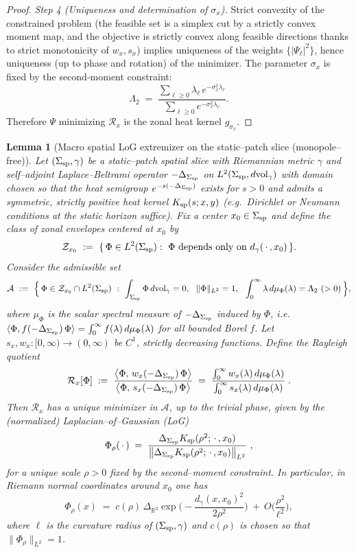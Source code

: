 \documentclass[10pt]{article}
\theoremstyle{definition}
\theoremstyle{plain}
\newtheorem{lemma}{Lemma}[section]
\begin{document}
\begin{proof}
\medskip
\textit{Step 4 (Uniqueness and determination of $\sigma_x$).}
Strict convexity of the constrained problem (the feasible set is a simplex cut by a strictly convex moment map, and the objective is strictly convex along feasible directions thanks to strict monotonicity of $w_x,s_x$) implies uniqueness of the weights $\{|\Psi_\ell|^2\}$, hence uniqueness (up to phase and rotation) of the minimizer. The parameter $\sigma_x$ is fixed by the second-moment constraint:
\[
\Lambda_2\;=\;\frac{\sum_{\ell\ge 0}\lambda_\ell\,e^{-\sigma_x^2\lambda_\ell}}{\sum_{\ell\ge 0}e^{-\sigma_x^2\lambda_\ell}}.
\]
Therefore $\Psi$ minimizing $\mathcal R_x$ is the zonal heat kernel $g_{\sigma_x}$.
\end{proof}

\begin{lemma}[Macro spatial LoG extremizer on the static--patch slice (monopole--free)]
\label{lem:spatial-log-static}
Let $(\Sigma_{\rm sp},\gamma)$ be a static--patch spatial slice with Riemannian metric $\gamma$ and
self--adjoint Laplace--Beltrami operator $-\Delta_{\Sigma_{\rm sp}}$ on $L^2(\Sigma_{\rm sp},d\mathrm{vol}_\gamma)$
with domain chosen so that the heat semigroup $e^{-s(-\Delta_{\Sigma_{\rm sp}})}$ exists for $s>0$ and admits a
symmetric, strictly positive heat kernel $K_{\rm sp}(s;x,y)$ (e.g.\ Dirichlet or Neumann conditions at the
static horizon suffice). Fix a center $x_0\in\Sigma_{\rm sp}$ and define the class of \emph{zonal} envelopes
centered at $x_0$ by
\[
\mathcal Z_{x_0}\ :=\ \{\,\Phi\in L^2(\Sigma_{\rm sp}):\ \Phi\ \text{depends only on }d_\gamma(\,\cdot\,,x_0)\,\}.
\]
Consider the admissible set
\[
\mathcal A\ :=\ \Big\{\,\Phi\in\mathcal Z_{x_0}\cap L^2(\Sigma_{\rm sp})\ :\ \int_{\Sigma_{\rm sp}}\Phi\,d\mathrm{vol}_\gamma=0,\ \ \|\Phi\|_{L^2}=1,\ \
\int_0^\infty \lambda\,d\mu_\Phi(\lambda)=\Lambda_2\ (>0)\,\Big\},
\]
where $\mu_\Phi$ is the scalar spectral measure of $-\Delta_{\Sigma_{\rm sp}}$ induced by $\Phi$, i.e.
$\langle \Phi, f(-\Delta_{\Sigma_{\rm sp}})\,\Phi\rangle=\int_0^\infty f(\lambda)\,d\mu_\Phi(\lambda)$
for all bounded Borel $f$. Let $s_x,w_x:[0,\infty)\to(0,\infty)$ be $C^1$, strictly decreasing functions.
Define the Rayleigh quotient
\[
\mathcal R_x[\Phi]\;:=\;\frac{\big\langle \Phi,\,w_x(-\Delta_{\Sigma_{\rm sp}})\,\Phi\big\rangle}{\big\langle \Phi,\,s_x(-\Delta_{\Sigma_{\rm sp}})\,\Phi\big\rangle}
\;=\;\frac{\int_0^\infty w_x(\lambda)\,d\mu_\Phi(\lambda)}{\int_0^\infty s_x(\lambda)\,d\mu_\Phi(\lambda)}\;.
\]
Then $\mathcal R_x$ has a unique minimizer in $\mathcal A$, up to the trivial phase, given by the (normalized)
\emph{Laplacian--of--Gaussian} (LoG)
\[
\Phi_\rho(\,\cdot\,)\;=\;\frac{\Delta_{\Sigma_{\rm sp}} K_{\rm sp}(\rho^2;\,\cdot\,,x_0)}{\big\|\Delta_{\Sigma_{\rm sp}} K_{\rm sp}(\rho^2;\,\cdot\,,x_0)\big\|_{L^2}}\ ,
\]
for a unique scale $\rho>0$ fixed by the second--moment constraint. In particular, in Riemann normal
coordinates around $x_0$ one has
\[
\Phi_\rho(x)\;=\;c(\rho)\,\Delta_{\mathbb R^3}\exp\!\Big(-\frac{d_\gamma(x,x_0)^2}{2\rho^2}\Big)\ +\ O\!\Big(\frac{\rho^2}{\ell^2}\Big),
\]
where $\ell$ is the curvature radius of $(\Sigma_{\rm sp},\gamma)$ and $c(\rho)$ is chosen so that
$\|\Phi_\rho\|_{L^2}=1$.
\end{lemma}
\end{document}
